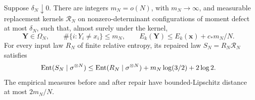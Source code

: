\begin{proposition}
\label{prop:microscopic-moment-repair}
Suppose $\delta_N\downarrow0$.  There are integers $m_N=o(N)$,
with $m_N\to\infty$, and measurable replacement kernels
$\mathcal R_N$ on nonzero-determinant configurations of moment defect
at most $\delta_N$, such that, almost surely under the kernel,
\[
 \boldsymbol Y\in\Omega_N,\qquad
 \#\{i:Y_i\ne x_i\}\leq m_N,\qquad
 E_k(\boldsymbol Y)\leq E_k(\boldsymbol x)+c_*m_N/N.
\]
For every input law $R_N$ of finite relative entropy, its repaired law
$S_N=R_N\mathcal R_N$ satisfies
\begin{equation}
 \operatorname{Ent}(S_N\mid\sigma^{\otimes N})
 \leq\operatorname{Ent}(R_N\mid\sigma^{\otimes N})
           +m_N\log(3/2)+2\log2.
 \label{eq:microscopic-repair-entropy}
\end{equation}
The empirical measures before and after repair have bounded-Lipschitz
distance at most $2m_N/N$.
\end{proposition}

